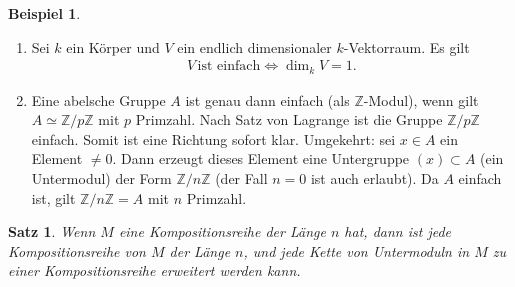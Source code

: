 \documentclass[reqno,12pt]{article}
\numberwithin{equation}{section}
\newcommand{\bZ}{\mathbb{Z}}
\newcommand{\iso}{\simeq}
\theoremstyle{plain}
\newtheorem{proposition}[thm]{Satz}
\theoremstyle{definition}
\newtheorem{example}[thm]{Beispiel}
\begin{document}
\begin{example}
\
\begin{enumerate}
\item Sei $k$ ein Körper und $V$ ein endlich dimensionaler $k$-Vektorraum. Es gilt
\begin{align*}
V \, \text{ist einfach} \iff \dim_k V = 1.
\end{align*}


\item Eine abelsche Gruppe $A$ ist genau dann einfach (als $\bZ$-Modul), wenn gilt $A \iso \bZ /p \bZ$ mit $p$ Primzahl. Nach Satz von Lagrange ist die Gruppe $\bZ /p \bZ$ einfach. Somit ist eine Richtung sofort klar. Umgekehrt: sei $x \in A$ ein Element $\neq 0$. Dann erzeugt dieses Element eine Untergruppe $(x) \subset A$ (ein Untermodul) der Form $\bZ / n \bZ$ (der Fall $n=0$ ist auch erlaubt). Da $A$ einfach ist, gilt $\bZ / n \bZ = A$ mit $n$ Primzahl.
\end{enumerate}
\end{example}


\newpage
\begin{proposition}\label{proposition-composition-series-have-the-same-length}
Wenn $M$ eine Kompositionsreihe der Länge $n$ hat, dann ist jede Kompositionsreihe von $M$ der Länge $n$, und jede Kette von Untermoduln in $M$ zu einer Kompositionsreihe erweitert werden kann.
\end{proposition}
\end{document}

